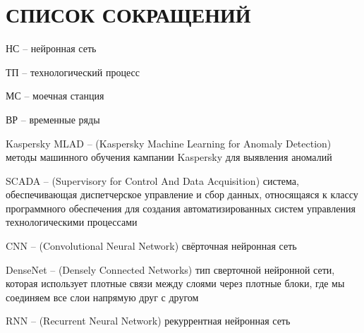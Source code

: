 \sectionbreak \section*{ 
    \gostTitleFont
    \redline
    СПИСОК СОКРАЩЕНИЙ
}
\titlespace

{\gostFont

\par \redline НС {--} нейронная сеть

\par \redline ТП {--} технологический процесс 

\par \redline МС {--} моечная станция

\par \redline ВР {--} временные ряды

\par \redline Kaspersky MLAD {--} (Kaspersky Machine Learning for Anomaly Detection) методы машинного обучения кампании Kaspersky для выявления аномалий

\par \redline SCADA {--} (Supervisory for Control And Data Acquisition) система, обеспечивающая диспетчерское управление и сбор данных, относящаяся к классу программного обеспечения для создания автоматизированных систем управления технологическими процессами

\par \redline CNN {--} (Convolutional Neural Network) свёрточная нейронная сеть

\par \redline DenseNet {--} (Densely Connected Networks) тип сверточной нейронной сети, которая использует плотные связи между слоями через плотные блоки, где мы соединяем все слои напрямую друг с другом

\par \redline RNN {--} (Recurrent Neural Network) рекуррентная нейронная сеть

\par 

}
